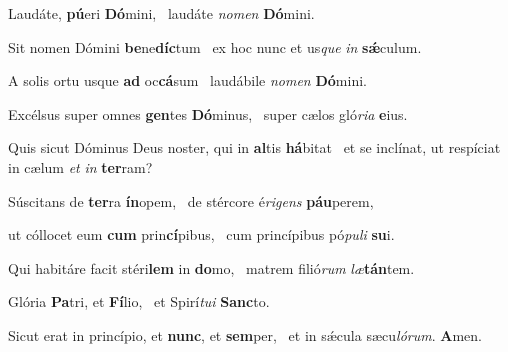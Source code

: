 \item Laudáte, \textbf{pú}eri \textbf{Dó}mini,~\psstar{} laudáte \textit{nomen} \textbf{Dó}mini.

\item Sit nomen Dómini \textbf{be}ne\textbf{díc}tum~\psstar{} ex hoc nunc et us\textit{que} \textit{in} \textbf{sǽ}culum.

\item A solis ortu usque \textbf{ad} oc\textbf{cá}sum~\psstar{} laudábile \textit{nomen} \textbf{Dó}mini.

\item Excélsus super omnes \textbf{gen}tes \textbf{Dó}minus,~\psstar{} super cælos gló\textit{ria} \textbf{e}ius.

\item Quis sicut Dóminus Deus noster, qui in \textbf{al}tis \textbf{há}bitat~\psstar{} et se inclínat, ut respíciat in cælum \textit{et} \textit{in} \textbf{ter}ram?

\item Súscitans de \textbf{ter}ra \textbf{ín}opem,~\psstar{} de stércore é\textit{rigens} \textbf{páu}perem,

\item ut cóllocet eum \textbf{cum} prin\textbf{cí}pibus,~\psstar{} cum princípibus pó\textit{puli} \textbf{su}i.

\item Qui habitáre facit stéri\textbf{lem} in \textbf{do}mo,~\psstar{} matrem filió\textit{rum} \textit{læ}\textbf{tán}tem.

\item Glória \textbf{Pa}tri, et \textbf{Fí}lio,~\psstar{} et Spirí\textit{tui} \textbf{Sanc}to.

\item Sicut erat in princípio, et \textbf{nunc}, et \textbf{sem}per,~\psstar{} et in sǽcula sæcu\textit{lórum}. \textbf{A}men.